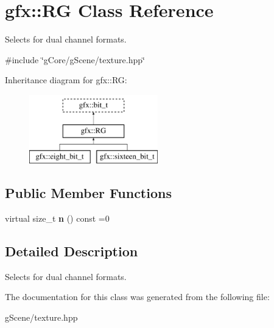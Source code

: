 \hypertarget{classgfx_1_1RG}{\section{gfx\-:\-:R\-G Class Reference}
\label{classgfx_1_1RG}
}


Selects for dual channel formats.  




{\ttfamily \#include \char`\"{}g\-Core/g\-Scene/texture.\-hpp\char`\"{}}

Inheritance diagram for gfx\-:\-:R\-G\-:\begin{figure}[H]
\begin{center}
\leavevmode
\includegraphics[height=3.000000cm]{classgfx_1_1RG}
\end{center}
\end{figure}
\subsection*{Public Member Functions}
\begin{DoxyCompactItemize}
\item 
\hypertarget{classgfx_1_1RG_a6367ebe6a7eb109c185bb894f2469df3}{virtual size\-\_\-t {\bfseries n} () const =0}\label{classgfx_1_1RG_a6367ebe6a7eb109c185bb894f2469df3}

\end{DoxyCompactItemize}


\subsection{Detailed Description}
Selects for dual channel formats. 

The documentation for this class was generated from the following file\-:\begin{DoxyCompactItemize}
\item 
g\-Scene/texture.\-hpp\end{DoxyCompactItemize}
